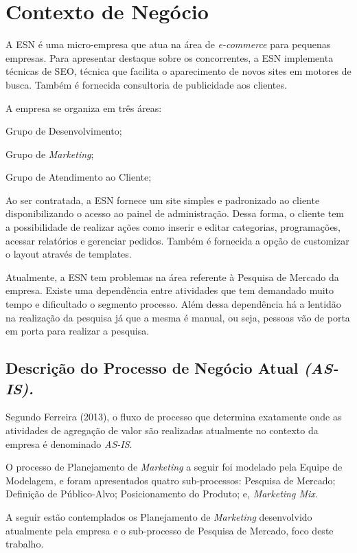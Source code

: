 \section{Contexto de Negócio}
	A ESN é uma micro-empresa que atua na área de \textit{e-commerce} para pequenas empresas. Para apresentar destaque sobre os concorrentes, a ESN implementa técnicas de SEO, técnica que facilita o aparecimento de novos sites em motores de busca. Também é fornecida consultoria de publicidade aos clientes.

	A empresa se organiza em três áreas:
	\begin{itemize}
	{
		\item Grupo de Desenvolvimento;
		\item Grupo de \textit{Marketing};
		\item Grupo de Atendimento ao Cliente;
	}
	\end{itemize}

	Ao ser contratada, a ESN fornece um site simples e padronizado ao cliente disponibilizando o acesso ao painel de administração. Dessa forma, o cliente tem a possibilidade de realizar ações como inserir e editar categorias, programações, acessar relatórios e gerenciar pedidos. Também é fornecida a opção de customizar o layout através de templates.

	Atualmente, a ESN tem problemas na área referente à Pesquisa de Mercado da empresa. Existe uma dependência entre atividades que tem demandado muito tempo e dificultado o segmento processo. Além dessa dependência há a lentidão na realização da pesquisa já que a mesma é manual, ou seja, pessoas vão de porta em porta para realizar a pesquisa.

	\subsection{Descrição do Processo de Negócio Atual \textit{(AS-IS).}}

		Segundo Ferreira (2013), o fluxo de processo que determina exatamente onde as atividades de agregação de valor são realizadas atualmente no contexto da empresa é denominado \textit{AS-IS}.

		O processo de Planejamento de \textit{Marketing} a seguir foi modelado pela Equipe de Modelagem, e foram apresentados quatro sub-processos: Pesquisa de Mercado; Definição de Público-Alvo; Posicionamento do Produto; e, \textit{Marketing Mix}.

		A seguir estão contemplados os Planejamento de \textit{Marketing} desenvolvido atualmente pela empresa e o sub-processo de Pesquisa de Mercado, foco deste trabalho.

